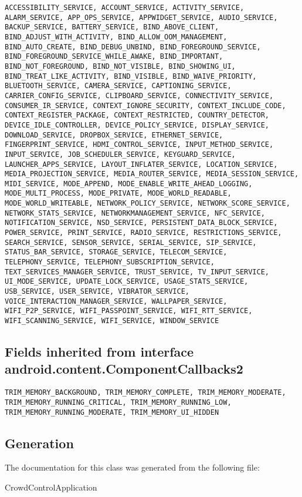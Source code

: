 \begin{lstlisting}
ACCESSIBILITY_SERVICE, ACCOUNT_SERVICE, ACTIVITY_SERVICE, ALARM_SERVICE, APP_OPS_SERVICE, APPWIDGET_SERVICE, AUDIO_SERVICE, BACKUP_SERVICE, BATTERY_SERVICE, BIND_ABOVE_CLIENT, BIND_ADJUST_WITH_ACTIVITY, BIND_ALLOW_OOM_MANAGEMENT, BIND_AUTO_CREATE, BIND_DEBUG_UNBIND, BIND_FOREGROUND_SERVICE, BIND_FOREGROUND_SERVICE_WHILE_AWAKE, BIND_IMPORTANT, BIND_NOT_FOREGROUND, BIND_NOT_VISIBLE, BIND_SHOWING_UI, BIND_TREAT_LIKE_ACTIVITY, BIND_VISIBLE, BIND_WAIVE_PRIORITY, BLUETOOTH_SERVICE, CAMERA_SERVICE, CAPTIONING_SERVICE, CARRIER_CONFIG_SERVICE, CLIPBOARD_SERVICE, CONNECTIVITY_SERVICE, CONSUMER_IR_SERVICE, CONTEXT_IGNORE_SECURITY, CONTEXT_INCLUDE_CODE, CONTEXT_REGISTER_PACKAGE, CONTEXT_RESTRICTED, COUNTRY_DETECTOR, DEVICE_IDLE_CONTROLLER, DEVICE_POLICY_SERVICE, DISPLAY_SERVICE, DOWNLOAD_SERVICE, DROPBOX_SERVICE, ETHERNET_SERVICE, FINGERPRINT_SERVICE, HDMI_CONTROL_SERVICE, INPUT_METHOD_SERVICE, INPUT_SERVICE, JOB_SCHEDULER_SERVICE, KEYGUARD_SERVICE, LAUNCHER_APPS_SERVICE, LAYOUT_INFLATER_SERVICE, LOCATION_SERVICE, MEDIA_PROJECTION_SERVICE, MEDIA_ROUTER_SERVICE, MEDIA_SESSION_SERVICE, MIDI_SERVICE, MODE_APPEND, MODE_ENABLE_WRITE_AHEAD_LOGGING, MODE_MULTI_PROCESS, MODE_PRIVATE, MODE_WORLD_READABLE, MODE_WORLD_WRITEABLE, NETWORK_POLICY_SERVICE, NETWORK_SCORE_SERVICE, NETWORK_STATS_SERVICE, NETWORKMANAGEMENT_SERVICE, NFC_SERVICE, NOTIFICATION_SERVICE, NSD_SERVICE, PERSISTENT_DATA_BLOCK_SERVICE, POWER_SERVICE, PRINT_SERVICE, RADIO_SERVICE, RESTRICTIONS_SERVICE, SEARCH_SERVICE, SENSOR_SERVICE, SERIAL_SERVICE, SIP_SERVICE, STATUS_BAR_SERVICE, STORAGE_SERVICE, TELECOM_SERVICE, TELEPHONY_SERVICE, TELEPHONY_SUBSCRIPTION_SERVICE, TEXT_SERVICES_MANAGER_SERVICE, TRUST_SERVICE, TV_INPUT_SERVICE, UI_MODE_SERVICE, UPDATE_LOCK_SERVICE, USAGE_STATS_SERVICE, USB_SERVICE, USER_SERVICE, VIBRATOR_SERVICE, VOICE_INTERACTION_MANAGER_SERVICE, WALLPAPER_SERVICE, WIFI_P2P_SERVICE, WIFI_PASSPOINT_SERVICE, WIFI_RTT_SERVICE, WIFI_SCANNING_SERVICE, WIFI_SERVICE, WINDOW_SERVICE
\end{lstlisting}




\subsection{Fields inherited from interface android.content.ComponentCallbacks2}
\begin{lstlisting}
TRIM_MEMORY_BACKGROUND, TRIM_MEMORY_COMPLETE, TRIM_MEMORY_MODERATE, TRIM_MEMORY_RUNNING_CRITICAL, TRIM_MEMORY_RUNNING_LOW, TRIM_MEMORY_RUNNING_MODERATE, TRIM_MEMORY_UI_HIDDEN
\end{lstlisting}

\subsection{Generation}
The documentation for this class was generated from the following file\-:
\begin{DoxyCompactItemize}
\item CrowdControlApplication
\end{DoxyCompactItemize} 









